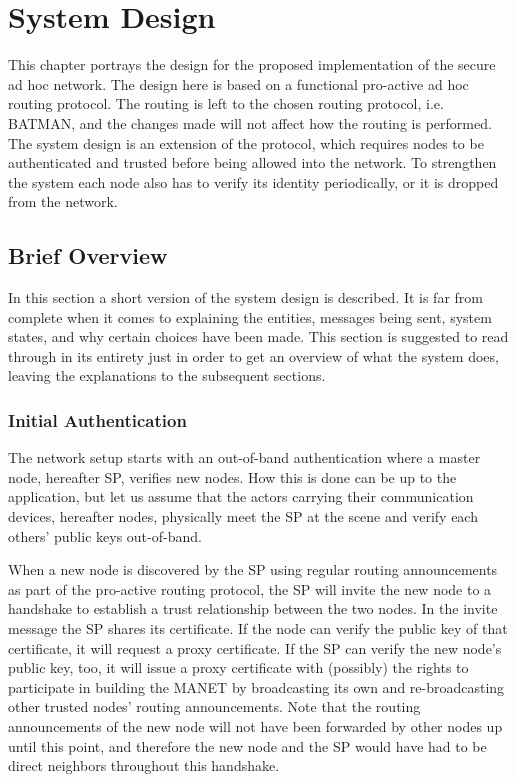 \chapter{System Design}
\label{ch:design}
\acresetall

This chapter portrays the design for the proposed implementation of the secure
ad hoc network. The design here is based on a functional pro-active ad hoc
routing protocol. The routing is left to the chosen routing protocol, i.e.
\ac{BATMAN}, and the changes made will not affect how the routing is performed.
The system design is an extension of the protocol, which requires nodes to be
authenticated and trusted before being allowed into the network. To strengthen
the system each node also has to verify its identity periodically, or it is
dropped from the network.

\section{Brief Overview}
In this section a short version of the system design is described. It is far
from complete when it comes to explaining the entities, messages being sent,
system states, and why certain choices have been made. This section is
suggested to read through in its entirety just in order to get an overview of
what the system does, leaving the explanations to the subsequent sections.

\subsection{Initial Authentication}
The network setup starts with an out-of-band authentication where a master node,
hereafter \ac{SP}, verifies new nodes. How this is done can be up to the
application, but let us assume that the actors carrying their communication
devices, hereafter nodes, physically meet the \ac{SP} at the scene and verify
each others' public keys out-of-band.

When a new node is discovered by the \ac{SP} using regular routing announcements
as part of the pro-active routing protocol, the \ac{SP} will invite the new node
to a handshake to establish a trust relationship between the two nodes. In the
invite message the \ac{SP} shares its certificate. If the node can verify the
public key of that certificate, it will request a proxy certificate. If the
\ac{SP} can verify the new node's public key, too, it will issue a proxy
certificate with (possibly) the rights to participate in building the
\ac{MANET} by broadcasting its own and re-broadcasting other trusted nodes'
routing announcements. Note that the routing announcements of the new node will
not have been forwarded by other nodes up until this point, and therefore the
new node and the \ac{SP} would have had to be direct neighbors throughout this
handshake.

